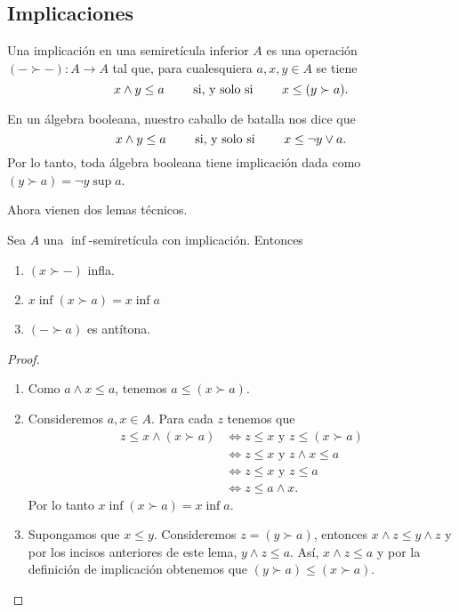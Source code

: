 \subsection{Implicaciones}

Una implicación en una semiretícula inferior $A$ es una operación
$(-\succ -):A\to A$ tal que, para cualesquiera $a,x,y\in A$ se tiene
\[
  x\wedge y\leq a \qquad\text{ si, y solo si }\qquad x\leq (y\succ a )
.\]

\begin{example}
  En un álgebra booleana, nuestro caballo de batalla nos dice que
  \[
    x\wedge y\leq a \qquad\text{ si, y solo si }\qquad
    x\leq \neg y\vee a
  .\]
  Por lo tanto, toda álgebra booleana tiene implicación dada
  como $(y\succ a)=\neg y\sup a$.
\end{example}

Ahora vienen dos lemas técnicos.
\begin{lemma}
  Sea $A$ una $\inf$-semiretícula con implicación.
  Entonces
  \begin{enumerate}
    \item $(x\succ -)$ infla.
    \item $x\inf(x\succ a) = x\inf a$
    \item $(-\succ a)$ es antítona.
  \end{enumerate}
\end{lemma}
\begin{proof}
    \begin{enumerate}
        \item Como $a\wedge x\leq a$, tenemos
        $a\leq (x\succ a).$
        \item Consideremos $a, x\in A$.
        Para cada $z$ tenemos que 
        \begin{align*}
            z\leq x\wedge (x\succ a)
            & \iff z\leq x \mbox{ y } z\leq (x\succ a)\\
            & \iff z\leq x \mbox{ y } z\wedge x\leq a\\
            & \iff z\leq x \mbox{ y } z\leq a\\
            & \iff z\leq a\wedge x.
        \end{align*}
        Por lo tanto $x\inf(x\succ a) = x\inf a$.
        \item Supongamos que $x\leq y$. Consideremos $z=(y\succ a)$, entonces $x\wedge z\leq y\wedge z$ y por los incisos anteriores de este lema, $y\wedge z\leq a$. Así, $x\wedge z\leq a$ y por la definición de implicación obtenemos que $(y\succ a)\leq (x\succ a)$. 
    \end{enumerate}
\end{proof}


